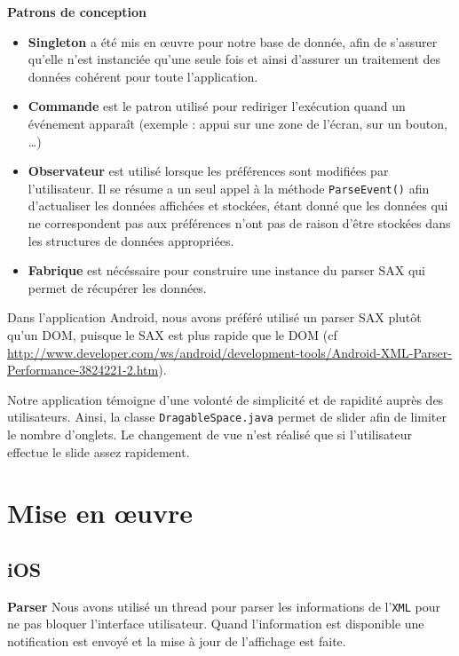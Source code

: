 \documentclass[a4paper, 11px]{article}
\begin{document}
{\bf Patrons de conception}

\begin{itemize}
	\item {\bf Singleton} a été mis en œuvre pour notre base de donnée, afin de s'assurer qu'elle n'est instanciée qu'une seule fois et ainsi d'assurer un traitement des données cohérent pour toute l'application.\\
	\item {\bf Commande} est le patron utilisé pour rediriger l'exécution quand un événement apparaît (exemple : appui sur une zone de l'écran, sur un bouton, \dots)\\
	\item {\bf Observateur} est utilisé lorsque les préférences sont modifiées par l'utilisateur. Il se résume a un seul appel à la méthode \texttt{ParseEvent()} afin d'actualiser les données affichées et stockées, étant donné que les données qui ne correspondent pas aux préférences n'ont pas de raison d'être stockées dans les structures de données appropriées.
	\item {\bf Fabrique} est nécéssaire pour construire une instance du parser SAX qui permet de récupérer les données.
\end{itemize}
Dans l'application Android, nous avons préféré utilisé un parser SAX plutôt qu'un DOM, puisque le SAX est plus rapide que le DOM (cf \href{http://www.developer.com/ws/android/development-tools/Android-XML-Parser-Performance-3824221-2.htm}{http://www.developer.com/ws/android/development-tools/Android-XML-Parser-Performance-3824221-2.htm}).



Notre application témoigne d'une volonté de simplicité et de rapidité auprès des utilisateurs. Ainsi, la classe \texttt{DragableSpace.java} permet de \og slider \fg afin de limiter le nombre d'onglets. Le changement de vue n'est réalisé que si l'utilisateur effectue le slide assez rapidement.

\section{Mise en œuvre}

\subsection{iOS}
{\bf Parser}
Nous avons utilisé un thread pour parser les informations de l'\texttt{XML} pour ne pas bloquer l'interface utilisateur. Quand l'information est disponible une notification est envoyé et la mise à jour de l'affichage est faite.
\end{document}
